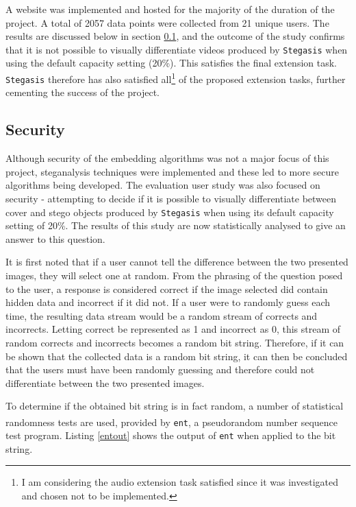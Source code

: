 \documentclass[paper=a4, fontsize=11pt,twoside]{scrartcl}
\numberwithin{table}{section}
\numberwithin{figure}{section}
\numberwithin{algorithm}{section}
\begin{document}
A website was implemented and hosted for the majority of the duration of the project. A total of 2057 data points were collected from 21 unique users. The results are discussed below in section \ref{security}, and the outcome of the study confirms that it is not possible to visually differentiate videos produced by \texttt{Stegasis} when using the default capacity setting (20\%). This satisfies the final extension task.\\

\noindent
\texttt{Stegasis} therefore has also satisfied all\footnote{I am considering the audio extension task satisfied since it was investigated and chosen not to be implemented.} of the proposed extension tasks, further cementing the success of the project.

\subsection{Security}
\label{security}

Although security of the embedding algorithms was not a major focus of this project, steganalysis techniques were implemented and these led to more secure algorithms being developed. The evaluation user study was also focused on security - attempting to decide if it is possible to visually differentiate between cover and stego objects produced by \texttt{Stegasis} when using its default capacity setting of 20\%. The results of this study are now statistically analysed to give an answer to this question.

It is first noted that if a user cannot tell the difference between the two presented images, they will select one at random. From the phrasing of the question posed to the user, a response is considered correct if the image selected did contain hidden data and incorrect if it did not. If a user were to randomly guess each time, the resulting data stream would be a random stream of corrects and incorrects. Letting correct be represented as 1 and incorrect as 0, this stream of random corrects and incorrects becomes a random bit string. Therefore, if it can be shown that the collected data is a random bit string, it can then be concluded that the users must have been randomly guessing and therefore could not differentiate between the two presented images.

To determine if the obtained bit string is in fact random, a number of statistical randomness tests are used, provided by \texttt{ent}\textsuperscript{\cite{ent}}, a pseudorandom number sequence test program. Listing \ref{entout} shows the output of \texttt{ent} when applied to the bit string.
\end{document}
